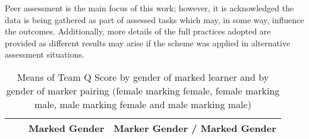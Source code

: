 \documentclass[sigconf, anonymous=false]{acmart}
\begin{document}
Peer assessment is the main focus of this work; however, it is
acknowledged the data is being gathered as part of assessed tasks
which may, in some way, influence the outcomes. Additionally, more
details of the full practices adopted are provided as different
results may arise if the scheme was applied in alternative assessment
situations.

\begin{table*}[ht]
	\caption{Means of Team Q Score by gender of marked learner and by gender of marker pairing (female marking female, female marking male, male marking female and male marking male)}
	\begin{tabular} {| p{2cm} | p{7cm} | p{1cm}| p{1cm} | p{1cm}| p{1cm} |p{1cm} |p{1cm} |} 
		\hline
		
		& & \multicolumn{2}{c}{Marked Gender}& \multicolumn{4}{c}{Marker Gender  / Marked Gender }  \\
		\hline
		
		
		

\end{tabular}
\end{table*}
\end{document}

